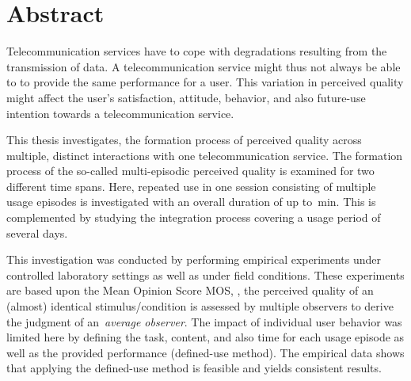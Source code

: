 
\chapter*{Abstract}
Telecommunication services have to cope with degradations resulting from the transmission of data.
A telecommunication service might thus not always be able to to provide the same performance for a user.
This variation in perceived quality might affect the user's satisfaction, attitude, behavior, and also future-use intention towards a telecommunication service.

This thesis investigates, the formation process of perceived quality across multiple, distinct interactions with one telecommunication service.
The formation process of the so-called multi-episodic perceived quality is examined for two different time spans.
Here, repeated use in one session consisting of multiple usage episodes is investigated with an overall duration of up to~\unit[45]{min}.
This is complemented by studying the integration process covering a usage period of several days.

This investigation was conducted by performing empirical experiments under controlled laboratory settings as well as under field conditions.
These experiments are based upon the Mean Opinion Score \acs{MOS}, \ie,  the perceived quality of an (almost) identical stimulus/condition is assessed by multiple observers to derive the judgment of an~\emph{average observer}.
The impact of individual user behavior was limited here by defining the task, content, and also time for each usage episode as well as the provided performance (defined-use method).
The empirical data shows that applying the defined-use method is feasible and yields consistent results.

